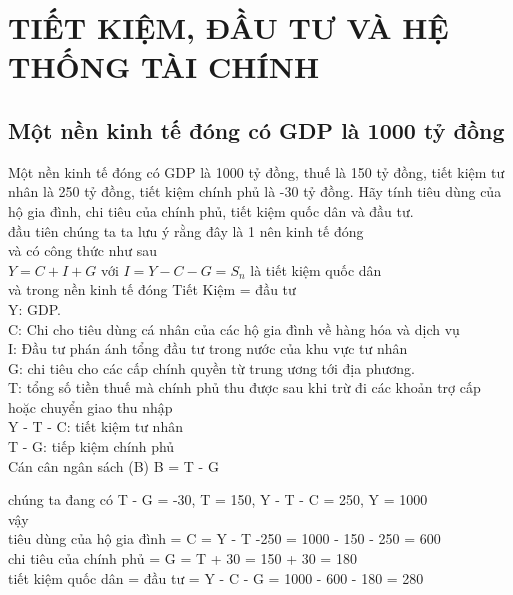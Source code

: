 \chapter{TIẾT KIỆM, ĐẦU TƯ VÀ 
HỆ THỐNG TÀI CHÍNH}

\setcounter{section}{1}
\section{Một nền kinh tế đóng có GDP là 1000 tỷ đồng}
Một nền kinh tế đóng có GDP là 1000 tỷ đồng, thuế là 150 tỷ đồng, tiết kiệm tư 
nhân là 250 tỷ đồng, tiết kiệm chính phủ là -30 tỷ đồng. Hãy tính tiêu dùng của hộ gia 
đình, chi tiêu của chính phủ, tiết kiệm quốc dân và đầu tư.\\
đầu tiên chúng ta ta lưu ý rằng đây là 1 nên kinh tế đóng \\
và có công thức như sau\\
$Y = C + I + G$ với $I = Y - C - G = S_n $ là tiết kiệm quốc dân\\
và trong nền kinh tế đóng Tiết Kiệm = đầu tư\\
Y: GDP. \\
C: Chi cho tiêu dùng cá nhân của các hộ gia đình về hàng hóa và dịch vụ \\
I: Đầu tư phán ánh tổng đầu tư trong nước của khu vực tư nhân \\
G: chi tiêu cho các cấp chính quyền từ trung ương tới địa phương.\\
T:  tổng số tiền thuế mà chính phủ thu được sau 
khi trừ đi các khoản trợ cấp hoặc chuyển giao thu nhập \\
Y - T - C: tiết kiệm tư nhân\\
T - G: tiếp kiệm chính phủ\\
Cán cân ngân sách (B) B = T - G

chúng ta đang có T - G = -30, T = 150, Y - T - C = 250, Y = 1000\\
vậy \\
tiêu dùng của hộ gia đình = C = Y - T -250 = 1000 - 150 - 250 = 600\\
chi tiêu của chính phủ = G = T + 30 = 150 + 30 = 180\\
tiết kiệm quốc dân = đầu tư = Y - C - G = 1000 - 600  - 180 = 280



